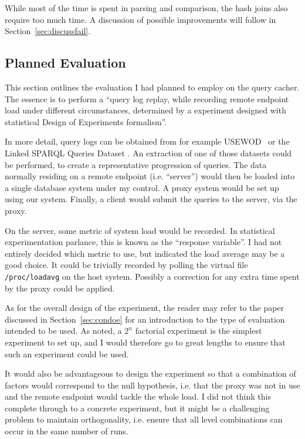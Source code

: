 While most of the time is spent in parsing and comparison, the hash
joins also require too much time. A discussion of possible
improvements will follow in Section~\ref{sec:discussfail}.

\subsection{Planned Evaluation}\label{sec:planned}

This section outlines the evaluation I had planned to employ on the
query cacher. The essence is to perform a ``query log replay, while
recording remote endpoint load under different circumstances,
determined by a experiment designed with statistical Design of
Experiments formalism''. 

In more detail, query logs can be obtained from
for example USEWOD~\cite{eps385344} or the Linked SPARQL Queries
Dataset \cite{Saleem2015}. An extraction of one of those datasets
could be performed, to create a representative progression of
queries. The data normally residing on a remote endpoint
(i.e. ``server'') would then be loaded into a single database system
under my control. A proxy system would be set up using our
system. Finally, a client would submit the queries to the server, via
the proxy. 

On the server, some metric of system load would be recorded. In
statistical experimentation parlance, this is known as the ``response
variable''. I had not entirely decided which metric to use, but
\cite{Ferrari:1987:EIL:647412.725013} indicated the load average may
be a good choice. It could be trivially recorded by polling the
virtual file \texttt{/proc/loadavg} on the host system. Possibly a
correction for any extra time spent by the proxy could be applied.

As for the overall design of the experiment, the reader may refer to
the paper discussed in Section~\ref{sec:condoe} for an introduction to
the type of evaluation intended to be used. As noted, a $2^n$
factorial experiment is the simplest experiment to set up, and I would
therefore go to great lengths to ensure that such an experiment could
be used.

It would also be advantageous to design the experiment so that a
combination of factors would correspond to the null hypothesis,
i.e. that the proxy was not in use and the remote endpoint would
tackle the whole load. I did not think this complete through to a
concrete experiment, but it might be a challenging problem to maintain
orthogonality, i.e. ensure that all level combinations can occur in
the same number of runs.

